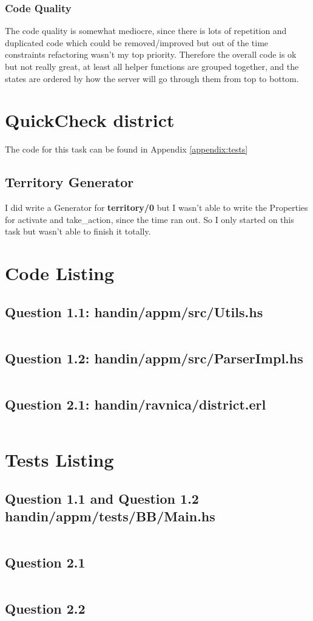 \documentclass[11pt,a4paper]{article}
\begin{document}
\subsubsection{Code Quality}
The code quality is somewhat mediocre, since there is lots of repetition and duplicated code which could be removed/improved but out of the time constraints refactoring wasn't my top priority. Therefore the overall code is ok but not really great, at least all helper functions are grouped together, and the states are ordered by how the server will go through them from top to bottom.
\section{QuickCheck district}
The code for this task can be found in Appendix \ref{appendix:tests}
\subsection{Territory Generator}
I did write a Generator for \textbf{territory/0} but I wasn't able to write the Properties for activate and take\_action, since the time ran out.
So I only started on this task but wasn't able to finish it totally.

\appendix
\section{Code Listing}
\subsection{Question 1.1: handin/appm/src/Utils.hs}
\label{appendix:question1-1}
\inputminted{haskell}{handin/appm/src/Utils.hs}
\subsection{Question 1.2: handin/appm/src/ParserImpl.hs}
\label{appendix:question1-2}
\inputminted{haskell}{handin/appm/src/ParserImpl.hs}
\subsection{Question 2.1: handin/ravnica/district.erl}
\inputminted{erlang}{handin/ravnica/district.erl}
\label{appendix:question2-1}

\section{Tests Listing}
\subsection{Question 1.1 and Question 1.2 handin/appm/tests/BB/Main.hs}
\inputminted{haskell}{handin/appm/tests/BB/Main.hs}
\subsection{Question 2.1}
\inputminted{erlang}{handin/ravnica/district_tests.erl}
\subsection{Question 2.2}
\inputminted{erlang}{handin/ravnica/district_qc.erl}
\label{appendix:tests}
\end{document}
